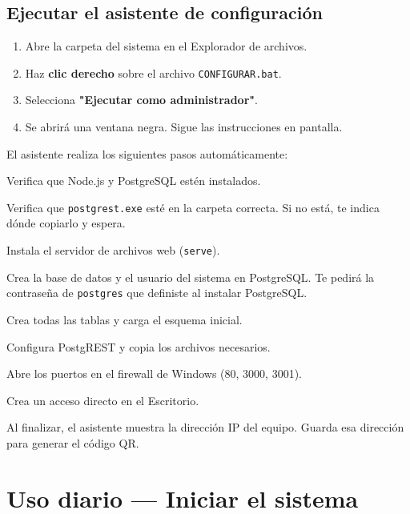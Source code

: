 \documentclass[12pt, a4paper]{article}
\begin{document}
\subsection{Ejecutar el asistente de configuración}

\begin{enumerate}
  \item Abre la carpeta del sistema en el Explorador de archivos.
  \item Haz \textbf{clic derecho} sobre el archivo \texttt{CONFIGURAR.bat}.
  \item Selecciona \textbf{"Ejecutar como administrador"}.
  \item Se abrirá una ventana negra. Sigue las instrucciones en pantalla.
\end{enumerate}

\medskip
El asistente realiza los siguientes pasos automáticamente:

\begin{enumerate}[label=\textbf{[\arabic*]}]
  \item Verifica que Node.js y PostgreSQL estén instalados.
  \item Verifica que \texttt{postgrest.exe} esté en la carpeta correcta.
        Si no está, te indica dónde copiarlo y espera.
  \item Instala el servidor de archivos web (\texttt{serve}).
  \item Crea la base de datos y el usuario del sistema en PostgreSQL.
        Te pedirá la contraseña de \texttt{postgres} que definiste al
        instalar PostgreSQL.
  \item Crea todas las tablas y carga el esquema inicial.
  \item Configura PostgREST y copia los archivos necesarios.
  \item Abre los puertos en el firewall de Windows (80, 3000, 3001).
  \item Crea un acceso directo en el Escritorio.
\end{enumerate}

\begin{exito}
  Al finalizar, el asistente muestra la dirección IP del equipo.
  Guarda esa dirección para generar el código QR.
\end{exito}

\section{Uso diario — Iniciar el sistema}
\end{document}
